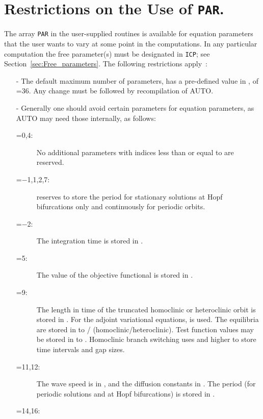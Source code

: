 \documentclass[12pt]{report}
\begin{document}
\section{ Restrictions on the Use of {\tt PAR}.} \label{sec:Restrictions_on_PAR}
The array {\tt PAR} in the user-supplied routines is available
for equation parameters that the user wants to vary at some point
in the computations.
In any particular computation the free parameter(s) must be designated
in {\tt ICP}; see Section~\ref{sec:Free_parameters}.
The following restrictions apply~:

\begin{itemize}
\item[-]
  The default maximum number of parameters,  has a
  pre-defined value in ,
  of =36.
  Any change  must be followed by recompilation of {\cal AUTO}.
\item[-]
  Generally one should avoid certain parameters for equation parameters,
  as {\cal AUTO} may need those internally, as follows:
\begin{description}
\item[=0,4:]
  No additional parameters with indices less than or equal
  to  are reserved.
\item[=$-$1,1,2,7:]
  \AUTO reserves  to store the period for stationary
  solutions at Hopf bifurcations only and continuously for periodic orbits.
\item[=$-$2:]
  The integration time is stored in .
\item[=5:]
  The value of the objective functional is stored in .
\item[=9:]
  The length in time of the truncated homoclinic or heteroclinic orbit
  is stored in . For the adjoint variational equations,
   is used. The equilibria are stored
  in  to /
  (homoclinic/heteroclinic). Test function values may be stored in
   to . Homoclinic branch switching uses
   and higher to store time intervals and gap sizes.
\item[=11,12:]
  The wave speed is in , and the diffusion 
  constants in . The period (for periodic
  solutions and at Hopf bifurcations) is stored in .
\item[=14,16:]

\end{description}
\end{itemize}
\end{document}
